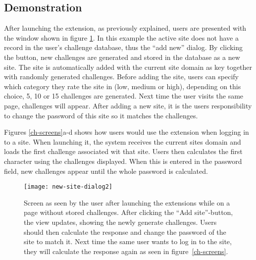 

\subsection{Demonstration}\label{demo}
After launching the extension, as previously explained, users are presented with the window shown in figure \ref{launch-screen}. In this example the active site does not have a record in the user's challenge database, thus the ``add new'' dialog. By clicking the button, new challenges are generated and stored in the database as a new site. The site is automatically added with the current site domain as key together with randomly generated challenges. Before adding the site, users can specify which category they rate the site in (low, medium or high), depending on this choice, 5, 10 or 15 challenges are generated. Next time the user visits the same page, challenges will appear. After adding a new site, it is the users responsibility to change the password of this site so it matches the challenges.

\par Figures \ref{ch-screens}a-d shows how users would use the extension when logging in to a site. When launching it, the system receives the current sites domain and loads the first challenge associated wit that site. Users then calculates the first character using the challenges displayed. When this is entered in the password field, new challenges appear until the whole password is calculated. 

\begin{figure}
    \centering
    \texttt{[image: new-site-dialog2]} 
    \caption{Screen as seen by the user after launching the extensions while on a page without stored challenges. After clicking the ``Add site''-button, the view updates, showing the newly generate challenges. Users should then calculate the response and change the password of the site to match it. Next time the same user wants to log in to the site, they will calculate the response again as seen in figure~\ref{ch-screens}.}
    \label{launch-screen}
\end{figure}

